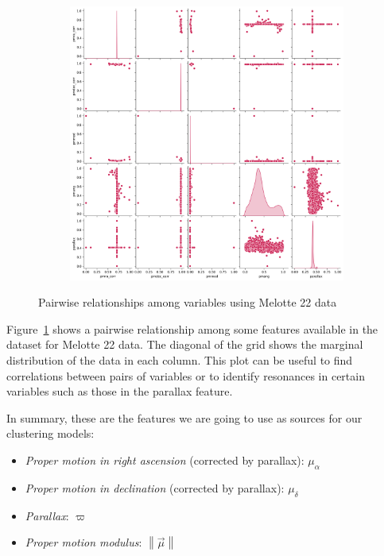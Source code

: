 \documentclass[11pt, a4paper, english]{book}
\begin{document}
\begin{figure}[htbp]
  \centering
  \begin{subfigure}{\textwidth}
    \centering
    \includegraphics[width=\textwidth]{../figures/melotte_22/features_melotte_22.png}
  \end{subfigure}
  \caption{Pairwise relationships among variables using Melotte 22 data}
  \label{fig:features_melotte_22}
\end{figure}

\newpage

Figure~\ref{fig:features_melotte_22} shows a pairwise relationship among some features available
in the dataset for Melotte 22 data.
The diagonal of the grid shows the marginal distribution of the data in each column.
This plot can be useful to find correlations between pairs of variables or
to identify resonances in certain variables such as those in the parallax feature.

In summary, these are the features we are going to use as sources for our clustering models:

\begin{itemize}
  \item \emph{Proper motion in right ascension} (corrected by parallax): \(\mu_{\alpha}\)
  \item \emph{Proper motion in declination} (corrected by parallax): \(\mu_{\delta}\)
  \item \emph{Parallax}: \( \varpi \)
  \item \emph{Proper motion modulus}: \(\left\| \vec{\mu} \right\|\)
\end{itemize}
\end{document}
